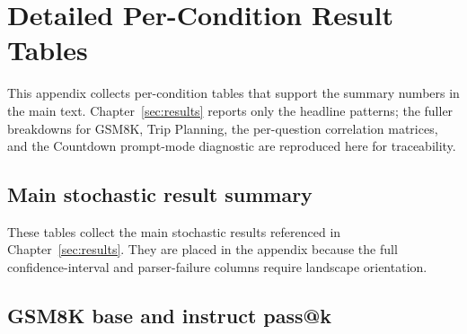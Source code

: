 \section{Detailed Per-Condition Result Tables}
\label{sec:appendix-detailed-results}

This appendix collects per-condition tables that support the summary numbers in the main text. Chapter~\ref{sec:results} reports only the headline patterns; the fuller breakdowns for GSM8K, Trip Planning, the per-question correlation matrices, and the Countdown prompt-mode diagnostic are reproduced here for traceability.

\FloatBarrier
\subsection{Main stochastic result summary}
\label{sec:appendix-main-stochastic-results}

These tables collect the main stochastic results referenced in Chapter~\ref{sec:results}. They are placed in the appendix because the full confidence-interval and parser-failure columns require landscape orientation.



\FloatBarrier
\subsection{GSM8K base and instruct pass@k}
\label{sec:appendix-gsm8k}

\begin{table}[H]
\centering
\caption{GSM8K base pass@k, $n=128$.}
\label{tab:gsm8k-base-zero}
\scriptsize
{}
\end{table}

